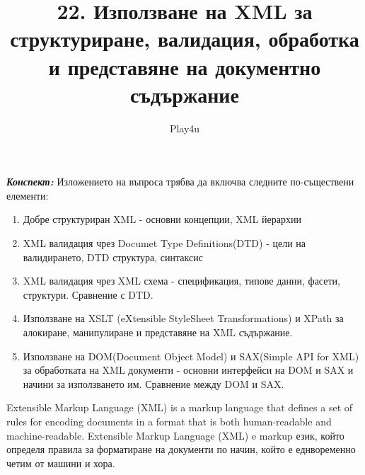\documentclass[11pt]{article} %
\title{22. Използване на XML за структуриране, валидация, обработка и представяне на документно съдържание}
\author{Play4u}
\newcommand{\italicBold}[1]{\textbf{\emph{#1}}}
\newcommand{\enumNum}{\renewcommand{\theenumi}{\arabic{enumi}}}
\begin{document}
\maketitle

\italicBold{Конспект: } Изложението на въпроса трябва да включва следните по-съществени елементи:

\enumNum
\begin{enumerate}[noitemsep]
	\item Добре структуриран XML - основни концепции, XML йерархии
	\item XML валидация чрез Documet Type Definitions(DTD) - цели на валидирането, DTD структура, синтаксис
	\item XML валидация чрез XML схема - спецификация, типове данни, фасети, структури. Сравнение с DTD.
	\item Използване на XSLT (eXtensible StyleSheet Transformations) и XPath за алокиране, манипулиране и представяне на XML съдържание.
	\item Използване на DOM(Document Object Model) и SAX(Simple API for XML) за обработката на XML документи - основни интерфейси на DOM и SAX и начини за използването им. Сравнение между DOM и SAX.\\\par
\end{enumerate}

Extensible Markup Language (XML) is a markup language that defines a set of rules for encoding documents in a format that is both human-readable and machine-readable.
Extensible Markup Language (XML) e markup език, който определя правила за форматиране на документи по начин, който е еднвоременно четим от машини и хора. 
\end{document}
